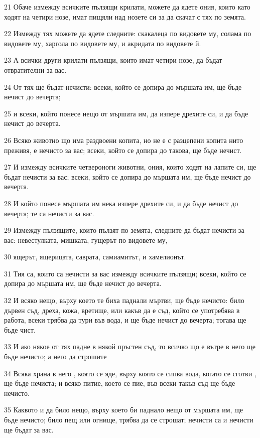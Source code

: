 \par 21 Обаче измежду всичките пълзящи крилати, можете да ядете ония, които като ходят на четири нозе, имат пищяли над нозете си за да скачат с тях по земята.
\par 22 Измежду тях можете да ядете следните: скакалеца по видовете му, солама по видовете му, харгола по видовете му, и акридата по видовете й.
\par 23 А всички други крилати пълзящи, които имат четири нозе, да бъдат отвратителни за вас.
\par 24 От тях ще бъдат нечисти: всеки, който се допира до мършата им, ще бъде нечист до вечерта;
\par 25 и всеки, който понесе нещо от мършата им, да изпере дрехите си, и да бъде нечист до вечерта.
\par 26 Всяко животно що има раздвоени копита, но не е с разцепени копита нито преживя, е нечисто за вас; всеки, който се допира до такова, ще бъде нечист.
\par 27 И измежду всичките четвероноги животни, ония, които ходят на лапите си, ще бъдат нечисти за вас; всеки, който се допира до мършата им, ще бъде нечист до вечерта.
\par 28 И който понесе мършата им нека изпере дрехите си, и да бъде нечист до вечерта; те са нечисти за вас.
\par 29 Измежду пълзящите, които пълзят по земята, следните да бъдат нечисти за вас: невестулката, мишката, гущерът по видовете му,
\par 30 ящерът, ящерицата, саврата, самиамитът, и хамелионът.
\par 31 Тия са, които са нечисти за вас измежду всичките пълзящи; всеки, който се допира до мършата им, ще бъде нечист до вечерта.
\par 32 И всяко нещо, върху което те биха паднали мъртви, ще бъде нечисто: било дървен съд, дреха, кожа, вретище, или какъв да е съд, който се употребява в работа, всеки трябва да тури във вода, и ще бъде нечист до вечерта; тогава ще бъде чист.
\par 33 И ако някое от тях падне в някой пръстен съд, то всичко що е вътре в него ще бъде нечисто; а него да строшите
\par 34 Всяка храна в него , която се яде, върху която се сипва вода, когато се сготви , ще бъде нечиста; и всяко питие, което се пие, във всеки такъв съд ще бъде нечисто.
\par 35 Каквото и да било нещо, върху което би паднало нещо от мършата им, ще бъде нечисто; било пещ или огнище, трябва да се строшат; нечисти са и нечисти ще бъдат за вас.
